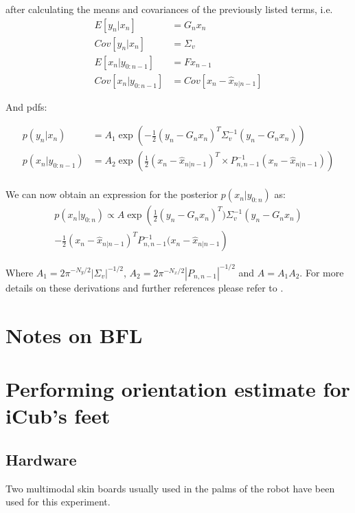 \documentclass[a4paper,10pt]{article}
\begin{document}
after calculating the means and covariances of the previously listed terms, i.e.
\begin{equation}
\begin{aligned}
 E[y_n|x_n]        &= G_n x_n\\
 Cov[y_n|x_n]       &= \Sigma_v\\
 E[x_n|y_{0:n-1}]   &= Fx_{n-1}\\
 Cov[x_n|y_{0:n-1}] &= Cov[x_n - \hat{x}_{n|n-1}]
\end{aligned}
\end{equation}


And pdfs:

\begin{align}
 p(y_n|x_n)       &= A_1 \exp(-\frac{1}{2}(y_n - G_n x_n)^T \Sigma^{-1}_v (y_n - G_n x_n)) \\
 p(x_n|y_{0:n-1}) &= A_2 \exp(\frac{1}{2}(x_n - \hat{x}_{n|n-1})^T \times P^{-1}_{n,n-1}(x_n - \hat{x}_{n|n-1}))\\
\end{align}

We can now obtain an expression for the posterior $p(x_n|y_{0:n})$ as:
\begin{multline}
 p(x_n|y_{0:n}) \propto A \exp\left(\frac{1}{2} (y_n - G_n x_n)^T)\Sigma^{-1}_v (y_n - G_n x_n) \right.\\
		\left.- \frac{1}{2}(x_n - \hat{x}_{n|n-1})^T P^{-1}_{n,n-1}(x_n - \hat{x}_{n|n-1}\right)
\end{multline}

Where $A_1 = 2\pi^{-N_y/2}|\Sigma_v|^{-1/2}$, $A_2 = 2\pi^{-N_x/2}|P_{n,n-1}|^{-1/2}$ and $A=A_1 A_2$. 
For more details on these derivations and further references please refer to \cite{Chen2003}.

\section{Notes on BFL}

\section{Performing orientation estimate for iCub's feet}


\subsection{Hardware}
Two multimodal skin boards usually used in the palms of the robot have been used for this experiment.


\newpage
 

\end{document}

